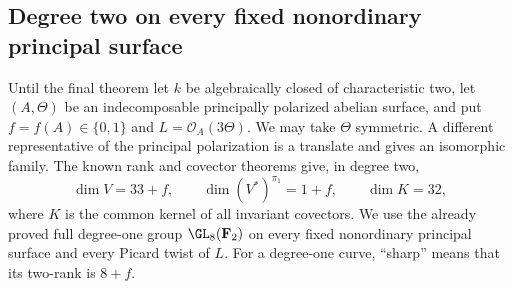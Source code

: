 \subsection{Degree two on every fixed nonordinary principal surface}
\label{subsec:nonordinary-ppav-degree-two-wreath-theta-candidate}

Until the final theorem let $k$ be algebraically closed of characteristic
two, let $(A,\Theta)$ be an indecomposable principally polarized abelian
surface, and put $f=f(A)\in\{0,1\}$ and $L=\mathcal O_A(3\Theta)$.
We may take $\Theta$ symmetric. A different representative of the
principal polarization is a translate and gives an isomorphic family.
The known rank and covector theorems give, in degree two,
\[
 \dim V=33+f,\qquad \dim(V^*)^{\pi_1}=1+f,
 \qquad \dim K=32,
\]
where $K$ is the common kernel of all invariant covectors. We use the
already proved full degree-one group $\GL_8(\mathbf F_2)$ on every
fixed nonordinary principal surface and every Picard twist of $L$.
For a degree-one curve, ``sharp'' means that its two-rank is $8+f$.

